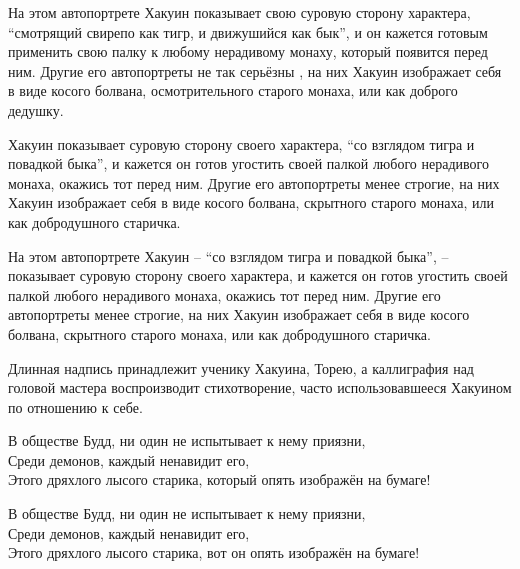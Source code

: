 \begin{ver}[1]
На этом автопортрете Хакуин показывает свою суровую сторону характера,
``смотрящий свирепо как тигр, и движушийся как бык'', и он кажется
готовым применить свою палку к любому нерадивому монаху, который
появится перед ним. Другие его автопортреты не так серьёзны , на них
Хакуин изображает себя в виде косого болвана, осмотрительного старого
монаха, или как доброго дедушку.
\end{ver}

\begin{ver}[2]
Хакуин показывает суровую сторону своего характера, ``со взглядом
тигра и повадкой быка'', и кажется он готов угостить своей палкой
любого нерадивого монаха, окажись тот перед ним. Другие его
автопортреты менее строгие, на них Хакуин изображает себя в виде
косого болвана, скрытного старого монаха, или как добродушного
старичка.
\end{ver}

\begin{ver}[3]
На этом автопортрете Хакуин -- ``со взглядом тигра и повадкой быка'', --
показывает суровую сторону своего характера, и кажется он готов
угостить своей палкой любого нерадивого монаха, окажись тот перед
ним. Другие его автопортреты менее строгие, на них Хакуин изображает
себя в виде косого болвана, скрытного старого монаха, или как
добродушного старичка.
\end{ver}

\begin{ver}[1]
Длинная надпись принадлежит ученику Хакуина, Торею, а
каллиграфия над головой мастера воспроизводит
стихотворение, часто использовавшееся Хакуином по
отношению к себе. 
\end{ver}

\begin{ver}[1]
  \begin{verses}
    В обществе Будд, ни один не испытывает к нему приязни,\\
    Среди демонов, каждый ненавидит его,\\ 
    Этого дряхлого лысого старика, который опять
    изображён на бумаге!
  \end{verses}
\end{ver}

\begin{ver}[2]
  \begin{verses}
    В обществе Будд, ни один не испытывает к нему приязни,\\
    Среди демонов, каждый ненавидит его,\\ 
    Этого дряхлого лысого старика, вот он опять
    изображён на бумаге!
  \end{verses}
\end{ver}

